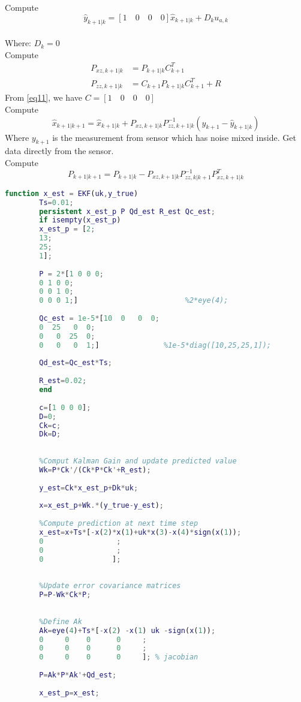 \documentclass[12pt,a4paper]{article}
\begin{document}
	Compute
	\[\hat{y}_{k+1|k} = [1\quad 0\quad 0\quad 0]\hat{x}_{k+1|k} + D_ku_{a,k}\]
	\\
	Where: \(D_k = 0\)
	\\
	Compute \[
	\begin{split}
		P_{xz,k+1|k} &= P_{k+1|k}C^T_{k+1}\\
		P_{zz,k+1|k} &= C_{k+1}P_{k+1|k}C^T_{k+1}+R
	\end{split}\]
	From \autoref{eq11}, we have \(C = [1\quad 0\quad 0\quad 0]\)
	\\
	Compute
	\[\boxed{\hat{x}_{k+1|k+1} = \hat{x}_{k+1|k} + P_{xz,k+1|k}P^{-1}_{zz,k+1|k}(y_{k+1}-\hat{y}_{k+1|k})}\]
	Where \(y_{k+1}\) is the measurement from sensor which has noise mixed inside. Get data directly from the sensor.
	\\
	Compute
	\[\boxed{P_{k+1|k+1} = P_{k+1|k} - P_{xz,k+1|k}P^{-1}_{zz,k|k+1}P^T_{xz,k+1|k}}\]
	
	
	
	
	
	
	
	
	\begin{lstlisting}[language=MATLAB]
		function x_est = EKF(uk,y_true)
		Ts=0.01;
		persistent x_est_p P Qd_est R_est Qc_est;
		if isempty(x_est_p)
		x_est_p = [2;
		13;
		25;
		1];
		
		P = 2*[1 0 0 0;
		0 1 0 0;
		0 0 1 0;
		0 0 0 1;]                         %2*eye(4);
		
		Qc_est = 1e-5*[10  0   0  0;
		0  25   0  0;
		0   0  25  0;
		0   0   0  1;]               %1e-5*diag([10,25,25,1]);
		
		Qd_est=Qc_est*Ts;
		
		R_est=0.02;
		end
		
		c=[1 0 0 0];
		D=0;
		Ck=c;
		Dk=D;
		
		
		%Comput Kalman Gain and update predicted value
		Wk=P*Ck'/(Ck*P*Ck'+R_est);
		
		y_est=Ck*x_est_p+Dk*uk;
		
		x=x_est_p+Wk.*(y_true-y_est);
		
		%Compute prediction at next time step
		x_est=x+Ts*[-x(2)*x(1)+uk*x(3)-x(4)*sign(x(1));
		0                 ;
		0                 ;
		0                ];
		
		
		%Update error covariance matrices
		P=P-Wk*Ck*P;
		
		
		%Define Ak
		Ak=eye(4)+Ts*[-x(2) -x(1) uk -sign(x(1));
		0     0    0      0     ;
		0     0    0      0     ;
		0     0    0      0     ]; % jacobian
		
		P=Ak*P*Ak'+Qd_est;
		
		x_est_p=x_est;
	\end{lstlisting}
\end{document}
